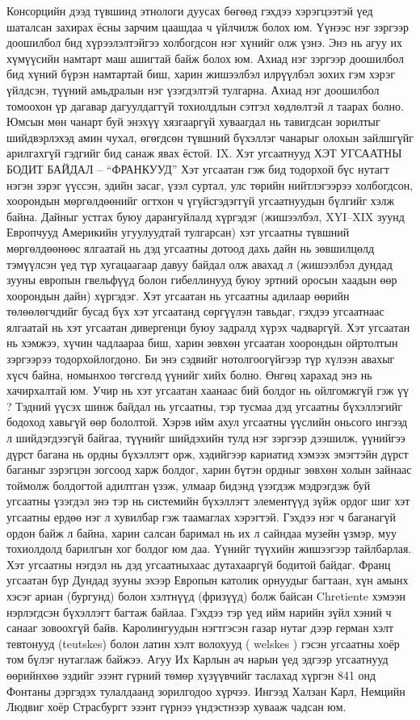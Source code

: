 Консорцийн дээд түвшинд этнологи дуусах бөгөөд гэхдээ хэрэгцээтэй үед шаталсан захирах ёсны зарчим цаашдаа ч үйлчилж болох юм. Үүнээс нэг зэргээр доошилбол бид хүрээлэлтэйгээ холбогдсон нэг хүнийг олж үзнэ. Энэ нь агуу их хүмүүсийн намтарт маш ашигтай байж болох юм. Ахиад нэг зэргээр доошилбол бид хүний бүрэн намтартай биш, харин жишээлбэл илрүүлбэл зохих гэм хэрэг үйлдсэн, түүний амьдралын нэг үзэгдэлтэй тулгарна. Ахиад нэг доошилбол томоохон үр дагавар дагуулдаггүй тохиолдлын сэтгэл хөдлөлтэй л таарах болно. Юмсын мөн чанарт буй энэхүү хязгааргүй хуваагдал нь тавигдсан зорилтыг шийдвэрлэхэд амин чухал, өгөгдсөн түвшний бүхэллэг чанарыг олохын зайлшгүйг арилгахгүй гэдгийг бид санаж явах ёстой.
IX. Хэт угсаатнууд
ХЭТ УГСААТНЫ БОДИТ БАЙДАЛ – “ФРАНКУУД”
Хэт угсаатан гэж бид тодорхой бүс нутагт нэгэн зэрэг үүссэн, эдийн засаг, үзэл суртал, улс төрийн нийтлэгээрээ холбогдсон, хоорондын мөргөлдөөнийг огтхон ч үгүйсгэдэггүй угсаатнуудын бүлгийг хэлж байна.
Дайныг устгах буюу дарангуйлалд хүргэдэг (жишээлбэл, XYI–XIX зуунд Европчууд Америкийн угуулуудтай тулгарсан) хэт угсаатны түвшний мөргөлдөөнөөс ялгаатай нь дэд угсаатны дотоод дахь дайн нь зөвшилцөлд тэмүүлсэн үед түр хугацаагаар давуу байдал олж авахад л (жишээлбэл дундад зууны европын гвельфүүд болон гибеллинууд буюу эртний оросын хаадын өөр хоорондын дайн) хүргэдэг. Хэт угсаатан нь угсаатны адилаар өөрийн төлөөлөгчдийг бусад бүх хэт угсаатанд сөргүүлэн тавьдаг, гэхдээ угсаатнаас ялгаатай нь хэт угсаатан дивергенци буюу задралд хүрэх чадваргүй. Хэт угсаатан нь хэмжээ, хүчин чадлаараа биш, харин зөвхөн угсаатан хоорондын ойртолтын зэргээрээ тодорхойлогдоно. Би энэ сэдвийг нотолгоогүйгээр түр хүлээн авахыг хүсч байна, номынхоо төгсгөлд үүнийг хийх болно.
Өнгөц харахад энэ нь хачирхалтай юм. Учир нь хэт угсаатан хаанаас бий болдог нь ойлгомжгүй гэж үү ? Тэдний үүсэх шинж байдал нь угсаатны, тэр тусмаа дэд угсаатны бүхэллэгийг бодоход хавьгүй өөр бололтой. Хэрэв ийм ахул угсаатны үүслийн оньсого ингээд л шийдэгдээгүй байгаа, түүнийг шийдэхийн тулд нэг зэргээр дээшилж, үүнийгээ дүрст багана нь ордны бүхэллэгт орж, хэдийгээр кариатид хэмээх эмэгтэйн дүрст баганыг зэрэгцэн зогсоод харж болдог, харин бүтэн ордныг зөвхөн холын зайнаас тоймолж болдогтой адилтган үзэж, улмаар бидэнд үзэгдэж мэдрэгдэж буй угсаатны үзэгдэл энэ тэр нь системийн бүхэллэгт элементүүд зүйж ордог шиг хэт угсаатны ердөө нэг л хувилбар гэж таамаглах хэрэгтэй. Гэхдээ нэг ч баганагүй ордон байж л байна, харин салсан баримал нь их л сайндаа музейн үзмэр, муу тохиолдолд барилгын хог болдог юм даа. Үүнийг түүхийн жишээгээр тайлбарлая.
Хэт угсаатны нэгдэл нь дэд угсаатныхаас дутахааргүй бодитой байдаг. Франц угсаатан бүр Дундад зууны эхээр Европын католик орнуудыг багтаан, хүн амынх хэсэг ариан (бургунд) болон хэлтнүүд (фризүүд) болж байсан Chretiente хэмээн нэрлэгдсэн бүхэллэгт багтаж байлаа. Гэхдээ тэр үед ийм нарийн зүйл хэний ч санааг зовоохгүй байв. Каролингуудын нэгтгэсэн газар нутаг дээр герман хэлт тевтонууд (teutskes) болон латин хэлт волохууд ( welskes ) гэсэн угсаатны хоёр том бүлэг нутаглаж байжээ. Агуу Их Карлын ач нарын үед эдгээр угсаатнууд өөрийнхөө эздийг эзэнт гүрний төмөр хүзүүвчийг таслахад хүргэн 841 онд Фонтаны дэргэдэх тулалдаанд зорилгодоо хүрчээ. Ингээд Халзан Карл, Немцийн Людвиг хоёр Страсбургт эзэнт гүрнээ үндэстнээр хувааж чадсан юм.
